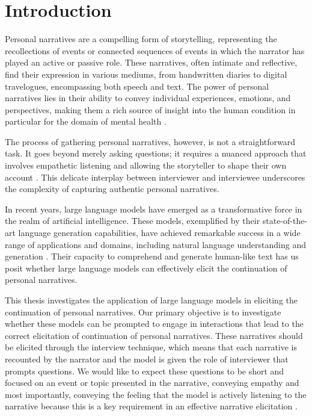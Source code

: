 \chapter{Introduction}
\label{cha:intro}
Personal narratives are a compelling form of storytelling, representing the recollections of events or connected sequences of events in which the narrator has played an active or passive role. These narratives, often intimate and reflective, find their expression in various mediums, from handwritten diaries to digital travelogues, encompassing both speech and text. The power of personal narratives lies in their ability to convey individual experiences, emotions, and perspectives, making them a rich source of insight into the human condition \cite{noauthor-undated-sy, doi:10.1080/1361332032000044567, Bailey2002-fw} in particular for the domain of mental health \cite{Nurser2018-id}. %

The process of gathering personal narratives, however, is not a straightforward task. It goes beyond merely asking questions; it requires a nuanced approach that involves empathetic listening and allowing the storyteller to shape their own account \cite{Kim2015-es}. This delicate interplay between interviewer and interviewee underscores the complexity of capturing authentic personal narratives.

In recent years, large language models have emerged as a transformative force in the realm of artificial intelligence. These models, exemplified by their state-of-the-art language generation capabilities, have achieved remarkable success in a wide range of applications and domains, including natural language understanding and generation \cite{openai2023gpt4, touvronllama, brown2020language}. Their capacity to comprehend and generate human-like text \cite{schramowski2022large} has us posit whether large language models can effectively elicit the continuation of personal narratives.

This thesis investigates the application of large language models in eliciting the continuation of personal narratives. Our primary objective is to investigate whether these models can be prompted to engage in interactions that lead to the correct elicitation of continuation of personal narratives. 
These narratives should be elicited through the interview technique, which means that each narrative is recounted by the narrator and the model is given the role of interviewer that prompts questions. We would like to expect these questions to be short and focused on an event or topic presented in the narrative, conveying empathy and most importantly, conveying the feeling that the model is actively listening to the narrative because this is a key requirement in an effective narrative elicitation \cite{Kim2015-es}.

